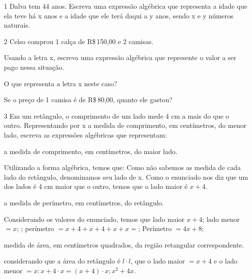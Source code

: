 \num{1} Dalva tem 44 anos. Escreva uma expressão algébrica que representa a
idade que ela teve há x anos e a idade que ele terá daqui a y anos,
sendo x e y números naturais.





\num{2} Celso comprou 1 calça de R\$\,150,00 e 2 camisas.

\begin{escolha}
\item Usando a letra x, escreva uma expressão algébrica que represente o valor a ser pago nessa situação.
\item O que representa a letra x neste caso?
\item Se o preço de 1 camisa é de R\$\,80,00, quanto ele gastou?
\end{escolha}






\num{3} Em um retângulo, o comprimento de um lado mede 4 cm a mais do que o
outro. Representando por x a medida de comprimento, em centímetros, do
menor lado, escreva as expressões algébricas que representam:


\begin{escolha}
\item a medida de comprimento, em centímetros, do maior lado.
        \item Utilizando a forma algébrica, temos que: Como não sabemos as medida de cada lado do retângulo, denominamos seu lado de x. Como o enunciado nos diz que um dos lados é 4 cm maior que o outro, temos que o lado maior é $x + 4$.
\item a medida de perímetro, em centímetros, do retângulo.
        \item Considerando os valores do enunciado, temos que lado maior $x + 4$; lado menor $= x$; ; perímetro $= x + 4 + x + 4 + x + x =$;  Perímetro $= 4x + 8$; 
\item medida de área, em centímetros quadrados, da região retangular correspondente.
        \item considerando que a área do retângulo é $l \cdot l$, que o lado maior $= x + 4$ e o lado menor $= x: x + 4 \cdot x = (x+4) \cdot x; x^2 + 4x$.
\end{escolha}





